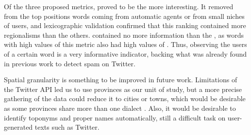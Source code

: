 Of the three proposed metrics, \usermetric{} proved to be the more interesting. It removed from the top positions words coming from automatic agents or from small niches of users, and lexicographic validation confirmed that this ranking contained more regionalisms than the others. \mixedmetric{} contained no more information than the \usermetric{}, as words with high values of this metric also had high values of \wordmetric{}. Thus, observing the users of a certain word is a very informative indicator, backing what was already found in previous work to detect spam on Twitter\cite{Cui:2012:DBE:2396761.2398519}.



Spatial granularity is something to be improved in future work. Limitations of the Twitter API led us to use provinces as our unit of study, but a more precise gathering of the data could reduce it to cities or towns, which would be desirable as some provinces share more than one dialect \cite{vidal1964espanol}. Also, it would be desirable to identify toponyms and proper names automatically, still a difficult task on user-generated texts such as Twitter. 




